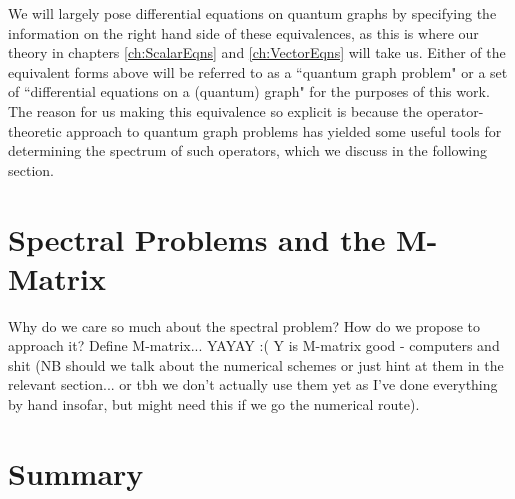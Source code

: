 We will largely pose differential equations on quantum graphs by specifying the information on the right hand side of these equivalences, as this is where our theory in chapters \ref{ch:ScalarEqns} and \ref{ch:VectorEqns} will take us.
Either of the equivalent forms above will be referred to as a ``quantum graph problem" or a set of ``differential equations on a (quantum) graph" for the purposes of this work.
The reason for us making this equivalence so explicit is because the operator-theoretic approach to quantum graph problems has yielded some useful tools for determining the spectrum of such operators, which we discuss in the following section.

\section{Spectral Problems and the M-Matrix} \label{sec:M-MatrixTheory}
Why do we care so much about the spectral problem?
How do we propose to approach it?
Define M-matrix... YAYAY :(
Y is M-matrix good - computers and shit (NB should we talk about the numerical schemes or just hint at them in the relevant section... or tbh we don't actually use them yet as I've done everything by hand insofar, but might need this if we go the numerical route).

\section{Summary} \label{sec:QGSummary}